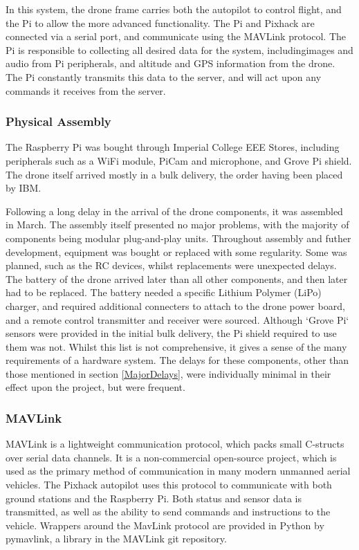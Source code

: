 \documentclass{article}
\begin{document}
In this system, the drone frame carries both the autopilot to control flight, and the Pi to allow the more advanced functionality. The Pi and Pixhack are connected via a serial port, and communicate using the MAVLink protocol. The Pi is responsible to collecting all desired data for the system, includingimages and audio from Pi peripherals, and altitude and GPS information from the drone. The Pi constantly transmits this data to the server, and will act upon any commands it receives from the server.

\subsubsection{Physical Assembly}
The Raspberry Pi was bought through Imperial College EEE Stores, including peripherals such as a WiFi module, PiCam and microphone, and Grove Pi shield. The drone itself arrived mostly in a bulk delivery, the order having been placed by IBM. 

Following a long delay in the arrival of the drone components, it was assembled in March. The assembly itself presented no major problems, with the majority of components being modular plug-and-play units. Throughout assembly and futher development, equipment was bought or replaced with some regularity. Some was planned, such as the RC devices, whilst replacements were unexpected delays. The battery of the drone arrived later than all other components, and then later had to be replaced. The battery needed a specific Lithium Polymer (LiPo) charger, and required additional connecters to attach to the drone power board, and a remote control transmitter and receiver were sourced. Although `Grove Pi` sensors were provided in the initial bulk delivery, the Pi shield required to use them was not. Whilst this list is not comprehensive, it gives a sense of the many requirements of a hardware system. The delays for these components, other than those mentioned in section \ref{MajorDelays}, were individually minimal in their effect upon the project, but were frequent. 

\subsubsection{MAVLink}
MAVLink is a lightweight communication protocol, which packs small C-structs over serial data channels\cite{qGroundMavlink}. It is a non-commercial open-source project, which is used as the primary method of communication in many modern unmanned aerial vehicles. The Pixhack autopilot uses this protocol to communicate with both ground stations and the Raspberry Pi. Both status and sensor data is transmitted, as well as the ability to send commands and instructions to the vehicle. Wrappers around the MavLink protocol are provided in Python by pymavlink, a library in the MAVLink git repository.
\end{document}
